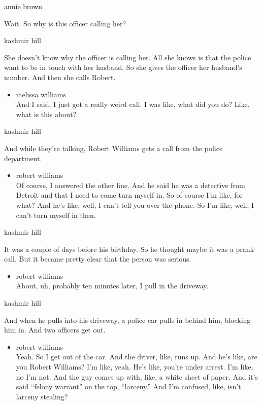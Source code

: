 annie brown

Wait. So why is this officer calling her?

kashmir hill

She doesn't know why the officer is calling her. All she knows is that
the police want to be in touch with her husband. So she gives the
officer her husband's number. And then she calls Robert.

\begin{itemize}
\tightlist
\item
  melissa williams\\
  And I said, I just got a really weird call. I was like, what did you
  do? Like, what is this about?
\end{itemize}

kashmir hill

And while they're talking, Robert Williams gets a call from the police
department.

\begin{itemize}
\tightlist
\item
  robert williams\\
  Of course, I answered the other line. And he said he was a detective
  from Detroit and that I need to come turn myself in. So of course I'm
  like, for what? And he's like, well, I can't tell you over the phone.
  So I'm like, well, I can't turn myself in then.
\end{itemize}

kashmir hill

It was a couple of days before his birthday. So he thought maybe it was
a prank call. But it became pretty clear that the person was serious.

\begin{itemize}
\tightlist
\item
  robert williams\\
  About, uh, probably ten minutes later, I pull in the driveway.
\end{itemize}

kashmir hill

And when he pulls into his driveway, a police car pulls in behind him,
blocking him in. And two officers get out.

\begin{itemize}
\tightlist
\item
  robert williams\\
  Yeah. So I get out of the car. And the driver, like, runs up. And he's
  like, are you Robert Williams? I'm like, yeah. He's like, you're under
  arrest. I'm like, no I'm not. And the guy comes up with, like, a white
  sheet of paper. And it's said ``felony warrant'' on the top,
  ``larceny.'' And I'm confused, like, isn't larceny stealing?
\end{itemize}

